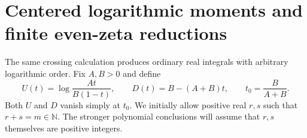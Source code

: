 \documentclass[11pt,letterpaper]{article}
\numberwithin{equation}{section}
\theoremstyle{definition}
\theoremstyle{remark}
\newcommand{\bcN}{\mathbb N}
\begin{document}
\section{Centered logarithmic moments and finite even-zeta reductions}
\label{bc:sec:moments}

The same crossing calculation produces ordinary real integrals with
arbitrary logarithmic order. Fix $A,B>0$ and define
\begin{equation}\label{bc:eq:centered-data}
 U(t)=\log\frac{At}{B(1-t)},\qquad
 D(t)=B-(A+B)t,\qquad t_0=\frac{B}{A+B}.
\end{equation}
Both $U$ and $D$ vanish simply at $t_0$. We initially allow positive real
$r,s$ such that $r+s=m\in\bcN$. The stronger polynomial conclusions will
assume that $r,s$ themselves are positive integers.
\end{document}

